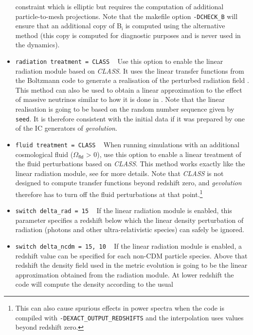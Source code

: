 \documentclass[a4paper,10pt]{article}
\begin{document}
\begin{itemize}
 constraint which is elliptic but requires the computation of additional particle-to-mesh projections. Note that the makefile option
 \texttt{-DCHECK\_B} will ensure that an additional copy of B$_\mathsf{i}$ is computed using the alternative method (this copy is computed
 for diagnostic purposes and is never used in the dynamics).
 \item[] \hspace{-25pt}\texttt{radiation treatment = CLASS} ~ Use this option to enable the linear radiation module based on \textit{CLASS}.
 It uses the linear transfer functions from the Boltzmann code to generate a realisation of the perturbed radiation field \cite{Adamek:2017grt}.
 This method can also be used to obtain a linear approximation to the effect of massive neutrinos similar to how it is done in \cite{Brandbyge:2008js}.
 Note that the linear realisation is going to be based on the random number sequence given
 by \texttt{seed}. It is therefore consistent with the initial data if it was prepared by one of the IC generators of \textit{gevolution}.
 \item[] \hspace{-25pt}\texttt{fluid treatment = CLASS} ~ When running simulations with an additional cosmological fluid ($\mathsf{\Omega}_\mathsf{fld}$ > 0),
 use this option to enable a linear treatment of the fluid perturbations based on \textit{CLASS}. This method works exactly like the linear radiation module, see
 \cite{Hassani:2019xxx} for more details. Note that \textit{CLASS} is not designed to compute transfer functions beyond redshift zero, and
 \textit{gevolution} therefore has to turn off the fluid perturbations at that point.\footnote{This can also cause spurious effects in power spectra
 when the code is compiled with \texttt{-DEXACT\_OUTPUT\_REDSHIFTS} and the interpolation uses values beyond redshift zero.}
 \item[] \hspace{-25pt}\texttt{switch delta\_rad = 15} ~ If the linear radiation module is enabled, this parameter specifies a
 redshift below which the linear density perturbation of radiation (photons and other ultra-relativistic species) can safely be ignored.
 \item[] \hspace{-25pt}\texttt{switch delta\_ncdm = 15, 10} ~ If the linear radiation module is enabled, a redshift value can be specified
 for each non-CDM particle species. Above that redshift the density field used in the metric evolution is going to be the linear
 approximation obtained from the radiation module. At lower redshift the code will compute the density according to the usual

\end{itemize}
\end{document}
